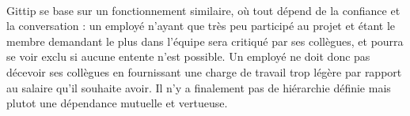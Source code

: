 \paragraph{}
Gittip se base sur un fonctionnement similaire, où tout dépend de la
confiance et la conversation : un employé n'ayant que très peu participé au
projet et étant le membre demandant le plus dans l'équipe sera critiqué par ses
collègues, et pourra se voir exclu si aucune entente n'est possible. Un employé
ne doit donc pas décevoir ses collègues en fournissant une charge de travail
trop légère par rapport au salaire qu'il souhaite avoir. Il n'y a
finalement pas de hiérarchie définie mais plutot une dépendance mutuelle
et vertueuse.
